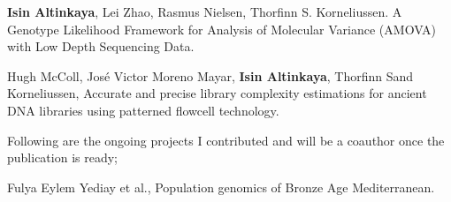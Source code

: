 \documentclass[letterpaper,10.5pt]{article}
\begin{document}
\medskip
\textbf{Isin Altinkaya}, Lei Zhao, Rasmus Nielsen, Thorfinn S. Korneliussen. A Genotype Likelihood Framework for Analysis of Molecular Variance (AMOVA) with Low Depth Sequencing Data. \\

\medskip

Hugh McColl, Jos\'e Victor Moreno Mayar, \textbf{Isin Altinkaya}, Thorfinn Sand Korneliussen, Accurate and precise library complexity estimations for ancient DNA libraries using patterned flowcell technology. \\

\medskip

Following are the ongoing projects I contributed and will be a coauthor once the publication is ready;
\medskip

Fulya Eylem Yediay et al., Population genomics of Bronze Age Mediterranean. \\


\end{document}

